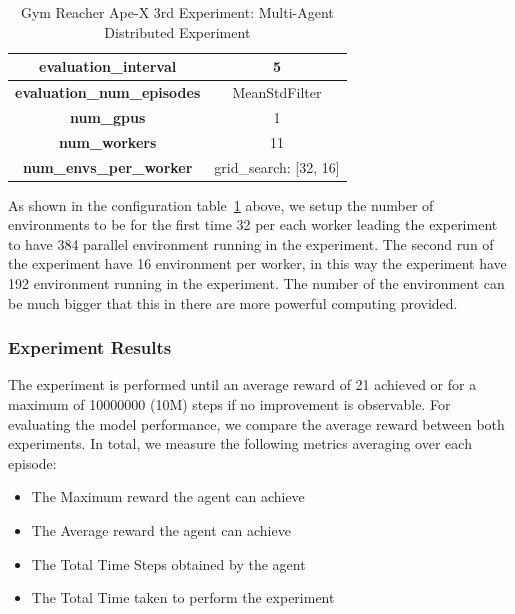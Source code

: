 \begin{table}[!htb]
\begin{tabular}{|c|l|l|c|l|l|}
				\multicolumn{3}{|c|}{\textbf{evaluation\_interval}}                          & \multicolumn{3}{c|}{5}                                             \\ \hline
				\multicolumn{3}{|c|}{\textbf{evaluation\_num\_episodes}}                  & \multicolumn{3}{c|}{MeanStdFilter}                                                  \\ \hline
				\multicolumn{3}{|c|}{\cellcolor[HTML]{C0C0C0}\textbf{num\_gpus}}    & \multicolumn{3}{c|}{\cellcolor[HTML]{C0C0C0}1}                                      \\ \hline
				\multicolumn{3}{|c|}{\cellcolor[HTML]{C0C0C0}\textbf{num\_workers}} & \multicolumn{3}{c|}{\cellcolor[HTML]{C0C0C0}11}                                      \\ \hline
				\multicolumn{3}{|c|}{\cellcolor[HTML]{C0C0C0}\textbf{num\_envs\_per\_worker}} & \multicolumn{3}{c|}{\cellcolor[HTML]{C0C0C0}grid\_search: [32, 16]}                                      \\ \hline
		\end{tabular}
		\caption{Gym Reacher Ape-X 3rd Experiment: Multi-Agent Distributed Experiment}
		\label{tab:gym_reacher_apex_3rd_exp}
\end{table}

As shown in the configuration table~\ref{tab:gym_reacher_apex_3rd_exp} above, we setup the number of environments to be for the first time 32 per each worker leading the experiment to have 384 parallel environment running in the experiment. The second run of the experiment have 16 environment per worker, in this way the experiment have 192 environment running in the experiment. The number of the environment can be much bigger that this in there are more powerful computing provided.


\subsubsection{Experiment Results}

The experiment is performed until an average reward of 21 achieved or for a maximum of 10000000 (10M) steps if no improvement is observable. For evaluating the model performance, we compare the average reward between both experiments. In total, we measure the following metrics averaging over each episode:
\begin{itemize}
		\item The Maximum reward the agent can achieve
		\item The Average reward the agent can achieve
		\item The Total Time Steps obtained by the agent
		\item The Total Time taken to perform the experiment
\end{itemize}

